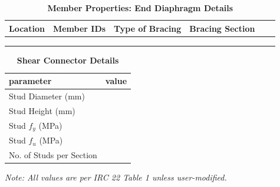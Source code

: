 \documentclass[12pt,a4paper]{report}
\numberwithin{table}{chapter}
\numberwithin{figure}{chapter}
\begin{document}
\vspace{0.4em}
\noindent
\setlength{\tabcolsep}{4pt}
\setlength\LTleft{0pt}
\setlength\LTright{\fill}

\begin{longtable}{|L{2.2cm}|L{2.2cm}|L{3.0cm}|L{2.5cm}|C{1.8cm}|C{1.8cm}|}
\caption{\textbf{Member Properties: End Diaphragm Details}}\\
\hline
\textbf{Location} & \textbf{Member IDs} & \textbf{Type of Bracing} & \textbf{Bracing Section} \\
\hline
 &  &  &  \\[6pt]
\hline
 &  &  &  \\[6pt]
\hline
 &  &  &  \\[6pt]
\hline
\end{longtable}



\label{subsec:shear-connectors}

\vspace{2.2em}

\vspace{0.4em}
\begin{longtable}{|L{5.5cm}|p{10.0cm}|}
\caption{\textbf{Shear Connector Details}}\\
\hline
\textbf{parameter} & \textbf{value} \\
\hline
\textnormal{Stud Diameter (mm)} &  \\[6pt]
\hline
\textnormal{Stud Height (mm)} &  \\[6pt]
\hline
\textnormal{Stud $f_y$ (MPa)} &  \\[6pt]
\hline
\textnormal{Stud $f_u$ (MPa)} &  \\[6pt]
\hline
\textnormal{No. of Studs per Section} &  \\[6pt]
\hline
\end{longtable}



\label{subsec:safety-factors}

\vspace{2.2em}

\vspace{0.3em}
\noindent\textit{Note: All values are per IRC 22 Table 1 unless user-modified.}
\end{document}
